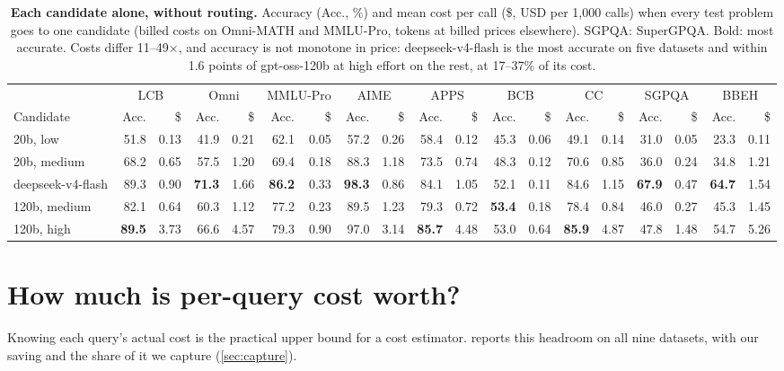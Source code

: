 \documentclass[10pt]{article}
\begin{document}
\begin{table}[t]
\centering
\footnotesize
\setlength{\tabcolsep}{2.6pt}
\begin{tabular}{lrrrrrrrrrrrrrrrrrr}
\toprule
 & \multicolumn{2}{c}{LCB} & \multicolumn{2}{c}{Omni} & \multicolumn{2}{c}{MMLU-Pro} & \multicolumn{2}{c}{AIME} & \multicolumn{2}{c}{APPS} & \multicolumn{2}{c}{BCB} & \multicolumn{2}{c}{CC} & \multicolumn{2}{c}{SGPQA} & \multicolumn{2}{c}{BBEH} \\
\cmidrule(lr){2-3}\cmidrule(lr){4-5}\cmidrule(lr){6-7}\cmidrule(lr){8-9}\cmidrule(lr){10-11}\cmidrule(lr){12-13}\cmidrule(lr){14-15}\cmidrule(lr){16-17}\cmidrule(lr){18-19}
Candidate & Acc. & \$ & Acc. & \$ & Acc. & \$ & Acc. & \$ & Acc. & \$ & Acc. & \$ & Acc. & \$ & Acc. & \$ & Acc. & \$ \\
\midrule
20b, low & 51.8 & 0.13 & 41.9 & 0.21 & 62.1 & 0.05 & 57.2 & 0.26 & 58.4 & 0.12 & 45.3 & 0.06 & 49.1 & 0.14 & 31.0 & 0.05 & 23.3 & 0.11 \\
20b, medium & 68.2 & 0.65 & 57.5 & 1.20 & 69.4 & 0.18 & 88.3 & 1.18 & 73.5 & 0.74 & 48.3 & 0.12 & 70.6 & 0.85 & 36.0 & 0.24 & 34.8 & 1.21 \\
deepseek-v4-flash & 89.3 & 0.90 & \textbf{71.3} & 1.66 & \textbf{86.2} & 0.33 & \textbf{98.3} & 0.86 & 84.1 & 1.05 & 52.1 & 0.11 & 84.6 & 1.15 & \textbf{67.9} & 0.47 & \textbf{64.7} & 1.54 \\
120b, medium & 82.1 & 0.64 & 60.3 & 1.12 & 77.2 & 0.23 & 89.5 & 1.23 & 79.3 & 0.72 & \textbf{53.4} & 0.18 & 78.4 & 0.84 & 46.0 & 0.27 & 45.3 & 1.45 \\
120b, high & \textbf{89.5} & 3.73 & 66.6 & 4.57 & 79.3 & 0.90 & 97.0 & 3.14 & \textbf{85.7} & 4.48 & 53.0 & 0.64 & \textbf{85.9} & 4.87 & 47.8 & 1.48 & 54.7 & 5.26 \\
\bottomrule
\end{tabular}
\caption{\textbf{Each candidate alone, without routing.} Accuracy (Acc., \%) and mean cost per call (\$, USD per 1,000 calls) when every test problem goes to one candidate (billed costs on Omni-MATH and MMLU-Pro, tokens at billed prices elsewhere). SGPQA: SuperGPQA. Bold: most accurate. Costs differ 11--49$\times$, and accuracy is not monotone in price: deepseek-v4-flash is the most accurate on five datasets and within 1.6 points of gpt-oss-120b at high effort on the rest, at 17--37\% of its cost.}
\label{tab:routes}
\end{table}


\section{How much is per-query cost worth?}\label{sec:headroom}
Knowing each query's actual cost is the practical upper bound for a cost estimator.  reports this headroom on all nine datasets, with our saving and the share of it we capture (\cref{sec:capture}).
\end{document}
